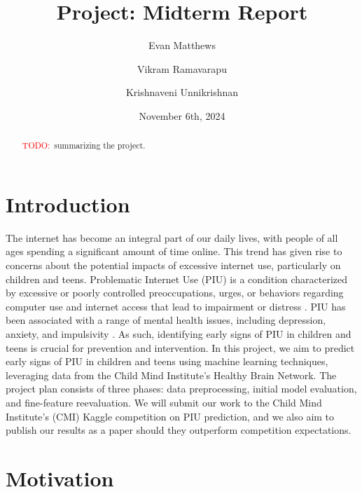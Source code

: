 \documentclass[11pt]{extarticle}
\title{Project: Midterm Report}
\author[1]{Evan Matthews}
\author[1]{Vikram Ramavarapu}
\author[1]{Krishnaveni Unnikrishnan}
\affil[1]{CS 412 Group G6}
\date{November 6th, 2024}
\newcommand{\todo}{\textcolor{red}{TODO:}~}
\begin{document}
\maketitle

\begin{abstract}
    \todo summarizing the project\cite{Pettorruso2020-qt,Cash2012-rb,Aboujaoude2010-mc,Restrepo2020-pb}.
\end{abstract}

\pagebreak


\section{Introduction}

The internet has become an integral part of our daily lives, with people of all ages spending a significant amount of time online. 
This trend has given rise to concerns about the potential impacts of excessive internet use, particularly on children and teens.
Problematic Internet Use (PIU) is a condition characterized by excessive or poorly controlled preoccupations, urges, or behaviors regarding computer use and internet access that lead to impairment or distress \cite{Pettorruso2020-qt}. 
PIU has been associated with a range of mental health issues, including depression, anxiety, and impulsivity \cite{Cash2012-rb}.
As such, identifying early signs of PIU in children and teens is crucial for prevention and intervention.
In this project, we aim to predict early signs of PIU in children and teens using machine learning techniques, leveraging data from the Child Mind Institute's Healthy Brain Network.
The project plan consists of three phases: data preprocessing, initial model evaluation, and fine-feature reevaluation.
We will submit our work to the Child Mind Institute's (CMI) Kaggle competition on PIU prediction, and we also aim to publish our results as a paper should they outperform competition expectations.


\section{Motivation} 
\end{document}
